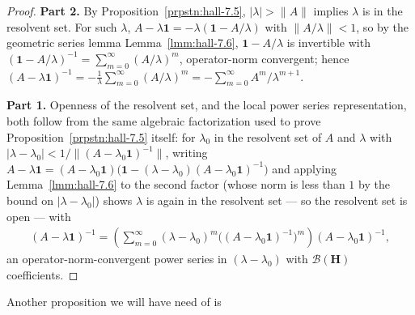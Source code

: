\begin{proof}
    \leanok
\textbf{Part 2.} By Proposition~\ref{prpstn:hall-7.5}, $\lvert \lambda \rvert>\|A\|$ implies $\lambda$ is in the resolvent set. For such $\lambda$, $A - \lambda\mathbf{1} = -\lambda(\mathbf{1} - A/\lambda)$ with $\|A/\lambda\| < 1$, so by the geometric series lemma Lemma~\ref{lmm:hall-7.6}, $\mathbf{1} - A/\lambda$ is invertible with $(\mathbf{1}-A/\lambda)^{-1} = \sum_{m=0}^\infty (A/\lambda)^m$, operator-norm convergent; hence $(A-\lambda\mathbf{1})^{-1} = -\frac{1}{\lambda}\sum_{m=0}^\infty (A/\lambda)^m = -\sum_{m=0}^\infty A^m/\lambda^{m+1}$.

\textbf{Part 1.} Openness of the resolvent set, and the local power series representation, both follow from the same algebraic factorization used to prove Proposition~\ref{prpstn:hall-7.5} itself: for $\lambda_0$ in the resolvent set of $A$ and $\lambda$ with $\lvert \lambda-\lambda_0 \rvert < 1/\|(A-\lambda_0\mathbf{1})^{-1}\|$, writing $A - \lambda\mathbf{1} = (A-\lambda_0\mathbf{1})\big(\mathbf{1} - (\lambda-\lambda_0)(A-\lambda_0\mathbf{1})^{-1}\big)$ and applying Lemma~\ref{lmm:hall-7.6} to the second factor (whose norm is less than $1$ by the bound on $\lvert \lambda-\lambda_0 \rvert$) shows $\lambda$ is again in the resolvent set — so the resolvent set is open — with
\begin{align}
    (A-\lambda\mathbf{1})^{-1} = \left( \sum_{m=0}^\infty (\lambda-\lambda_0)^m \big((A-\lambda_0\mathbf{1})^{-1}\big)^m \right)(A-\lambda_0\mathbf{1})^{-1},
\end{align}
an operator-norm-convergent power series in $(\lambda-\lambda_0)$ with $\mathcal{B}(\mathbf{H})$ coefficients.
\end{proof}

Another proposition we will have need of is

